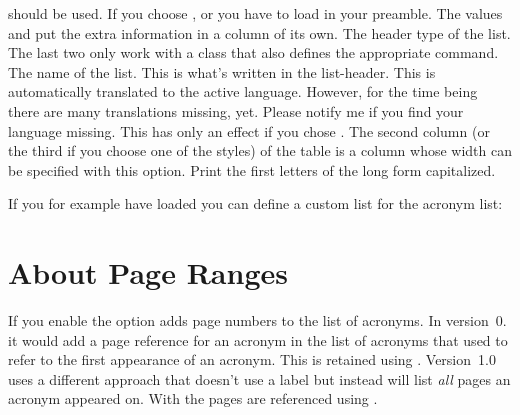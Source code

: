 \documentclass[DIV10,toc=index,toc=bib,hyperfootnotes=false]{cnpkgdoc}
\makeatletter
\providecommand*\changedversion[1]{%
  \@bsphack
  \marginnote{%
    \footnotesize\sffamily\RaggedRight
    \textcolor{black!75}{Changed in version~#1}}%
  \@esphack}
\newcommand\versionstar{\texorpdfstring{\@versionstar}{*}}
\makeatother
\begin{document}
\begin{beschreibung}
   should be used. If you choose ,  or
    you have to load  in your preamble.
   The values  and  put the extra
   information in a column of its own.
   \changedversion{1.1}The header type of the list. The last two only work with
   a \KOMAScript{} class that also defines the appropriate command.
   The name of the list. This is what's written in the list-header. This is
   automatically translated to the active language. However, for the time being
   there are many translations missing, yet. Please notify me if you find your
   language missing.
   This has only an effect if you chose . The second column
   (or the third if you choose one of the  styles) of the table is a
    column whose width can be specified with this option.
   Print the first letters of the long form capitalized.
\end{beschreibung}

If you for example have loaded  you can define a custom list for
the acronym list:
\begin{beispiel}
 \newcommand*\addcolon[1]{#1:}
 \printacronyms
\end{beispiel}
\newcommand*\addcolon[1]{#1:}
\printacronyms

\section{About Page Ranges}
If you enable the  option \acro adds page numbers to the list of
acronyms. In version~0.\versionstar{} it would add a page reference for an acronym
in the list of acronyms that used  to refer to the first appearance
of an acronym. This is retained using . Version~1.0 uses a
different approach that doesn't use a label but instead will list \emph{all}
pages an acronym appeared on. With  the pages are referenced
using .
\end{document}
